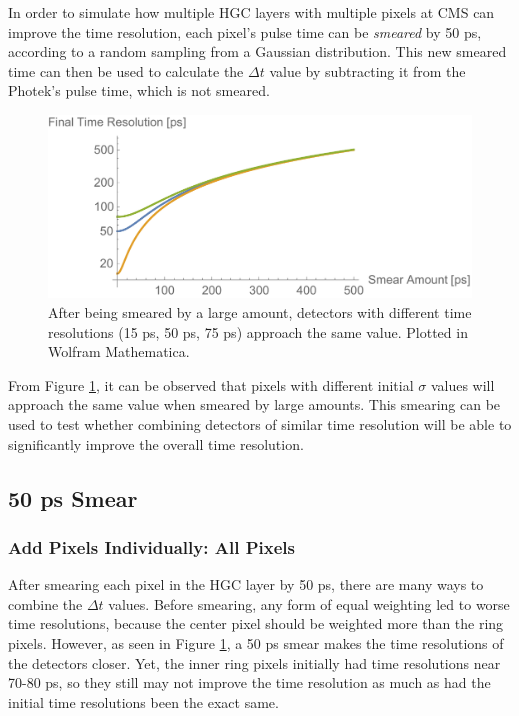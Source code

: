 \documentclass[12pt]{article}
\begin{document}
In order to simulate how multiple HGC layers with multiple pixels at CMS can improve the time resolution, each pixel's pulse time can be \textit{smeared} by 50 ps, according to a random sampling from a Gaussian distribution.
This new smeared time can then be used to calculate the $\Delta t$ value by subtracting it from the Photek's pulse time, which is not smeared.

\begin{figure}[h]
	\centering
	\includegraphics[width=.75\textwidth]{mathematica_plot.pdf}
	\caption{After being smeared by a large amount, detectors with different time resolutions (15 ps, 50 ps, 75 ps) approach the same value. Plotted in Wolfram Mathematica.}
	\label{fig:mathematica_plot}
\end{figure}

From Figure \ref{fig:mathematica_plot}, it can be observed that pixels with different initial $\sigma$ values will approach the same value when smeared by large amounts. 
This smearing can be used to test whether combining detectors of similar time resolution will be able to significantly improve the overall time resolution.

\subsection{50 ps Smear}
\subsubsection{Add Pixels Individually: All Pixels}
After smearing each pixel in the HGC layer by 50 ps, there are many ways to combine the $\Delta t$ values. 
Before smearing, any form of equal weighting led to worse time resolutions, because the center pixel should be weighted more than the ring pixels.
However, as seen in Figure \ref{fig:mathematica_plot}, a 50 ps smear makes the time resolutions of the detectors closer. 
Yet, the inner ring pixels initially had time resolutions near 70-80 ps, so they still may not improve the time resolution as much as had the initial time resolutions been the exact same.
\end{document}
